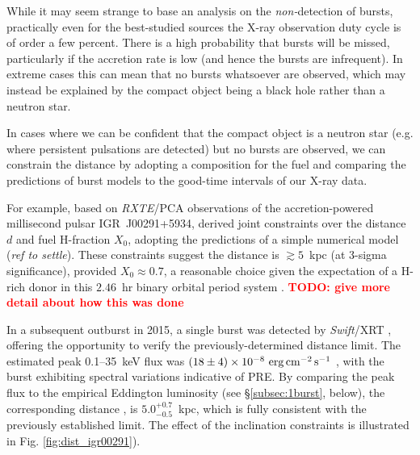 \documentclass{aastex63}
\newcommand{\epcs}{{\rm erg\,cm^{-2}\,s^{-1}}}
\newcommand{\todo}[1]{\textbf{\textcolor{red}{TODO: #1}}} %
\begin{document}
While it may seem strange to base an analysis on the {\it non-}detection of bursts, practically even for the best-studied sources the X-ray observation duty cycle is of order a few percent. There is a high probability that bursts will be missed, particularly if the accretion rate is low (and hence the bursts are infrequent). In extreme cases this can mean that no bursts whatsoever are observed, which may instead be explained by the compact object being a black hole rather than a neutron star.

In cases where we can be confident that the compact object is a neutron star (e.g. where persistent pulsations are detected) but no bursts are observed, we can constrain the distance by adopting a composition for the fuel and comparing the predictions of burst models to the good-time intervals of our X-ray data.

For example, based on {\it RXTE}/PCA observations of the accretion-powered millisecond pulsar IGR~J00291+5934, \cite{gal06b} derived joint constraints over the distance $d$ and fuel H-fraction $X_0$, adopting  the predictions of a simple numerical model ({\it ref to {\sc settle}}). These constraints suggest the distance is $\gtrsim5$~kpc (at 3-sigma significance), provided $X_0\approx0.7$, a reasonable choice given the expectation of a H-rich donor in this $2.46$~hr binary orbital period system \cite[]{gal05a}.  \todo{give more detail about how this was done}

In a subsequent outburst in 2015, a single burst was detected by {\it Swift}/XRT \cite[]{kuin15}, offering the opportunity to verify the previously-determined distance limit. The estimated peak 
0.1--35~keV flux was $(18\pm4)\times10^{-8}\ \epcs$ \cite[]{defalco17}, with the burst exhibiting spectral variations indicative of PRE. By comparing the peak flux to the empirical Eddington luminosity (see \S\ref{subsec:1burst}, below), the corresponding distance 
\cite[including the inclination range of 22--32$^\circ$ suggested by][]{torres08},
is $5.0_{-0.5}^{+0.7}$~kpc, which is fully consistent with the previously established limit. The effect of the inclination constraints is illustrated in Fig. \ref{fig:dist_igr00291}).
\end{document}

